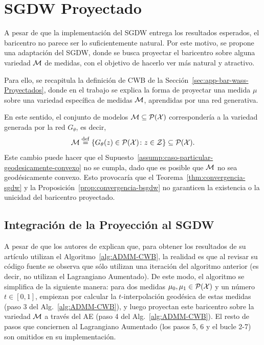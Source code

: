 \section{SGDW Proyectado}\label{sec:sgdwp}  %


A pesar de que la implementación del SGDW entrega los resultados esperados, el baricentro no parece ser lo suficientemente natural. Por este motivo, se propone una adaptación del SGDW, donde se busca proyectar el baricentro sobre alguna variedad $\Manifold$ de medidas, con el objetivo de hacerlo ver más natural y atractivo.

Para ello, se recapitula la definición de CWB de la Sección~\ref{sec:app-bar-wass-Proyectados}, donde en el trabajo \cite{simon2020barycenters} se explica la forma de proyectar una medida $\mu$ sobre una variedad específica de medidas $\Manifold$, aprendidas por una red generativa.

En este sentido, el conjunto de modelos $\Manifold\subseteq \ProbSpace[\cX] $ correspondería a la variedad generada por la red $G_\theta$, es decir,
\begin{equation}
    \Manifold \eqdef \left\{ G_\theta(z) \in \ProbSpace[\cX] \colon z \in \cZ \right\} \subseteq \ProbSpace[\cX].
\end{equation}
Este cambio puede hacer que el Supuesto~\ref{assump:caso-particular-geodesicamente-convexo} no se cumpla, dado que es posible que $\Manifold$ no sea geodésicamente convexo. Esto provocaría que el Teorema~\ref{thm:convergencia-sgdw} y la Proposición~\ref{prop:convergencia-bsgdw} no garanticen la existencia o la unicidad del baricentro proyectado.





\subsection{Integración de la Proyección al SGDW}\label{ssec:sgdwp-deduccion-algoritmo}  %

A pesar de que los autores de \cite{simon2020barycenters} explican que, para obtener los resultados de su artículo utilizan el Algoritmo~\ref{alg:ADMM-CWB}, la realidad es que al revisar su código fuente \cite{imagebar2020simon} se observa que sólo utilizan una iteración del algoritmo anterior (es decir, no utilizan el Lagrangiano Aumentado). De este modo, el algoritmo se simplifica de la siguiente manera: para dos medidas $\mu_0, \mu_1 \in \ProbSpace[\cX] $ y un número $t \in [0, 1]$, empiezan por calcular la $t$-interpolación geodésica de estas medidas (paso 3 del Alg.~\ref{alg:ADMM-CWB}), y luego proyectan este baricentro sobre la variedad $\Manifold$ a través del AE (paso 4 del Alg.~\ref{alg:ADMM-CWB}). El resto de pasos que conciernen al Lagrangiano Aumentado (los pasos 5, 6 y el bucle 2-7) son omitidos en su implementación.

